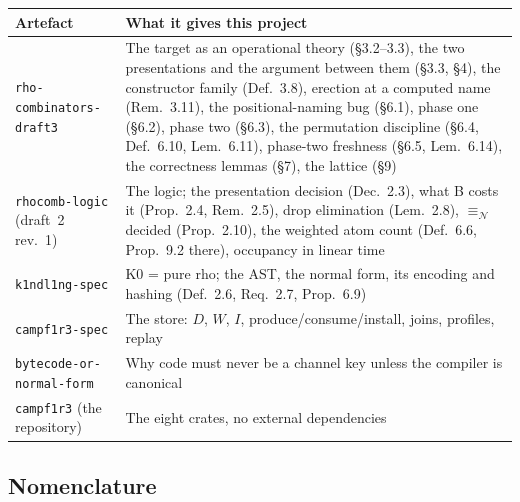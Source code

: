 \documentclass[11pt,a4paper]{article}
\newcommand{\code}[1]{\texttt{#1}}
\newcommand{\nequiv}{\equiv_{\mathcal{N}}}
\theoremstyle{definition}
\theoremstyle{plain}
\begin{document}
\begin{center}
\begin{tabularx}{\linewidth}{@{}l>{\raggedright\arraybackslash}X@{}}
\toprule
Artefact & What it gives this project\\
\midrule
\code{rho-combinators-draft3} & The target as an operational theory
(\S3.2--3.3), the two presentations and the argument between them (\S3.3,
\S4), the constructor family (Def.~3.8), erection at a computed name
(Rem.~3.11), the positional-naming bug (\S6.1), phase one (\S6.2), phase two
(\S6.3), the permutation discipline (\S6.4, Def.~6.10, Lem.~6.11), phase-two
freshness (\S6.5, Lem.~6.14), the correctness lemmas (\S7), the lattice
(\S9)\\
\code{rhocomb-logic} (draft~2 rev.~1) & The logic; the presentation decision
(Dec.~2.3), what B costs it (Prop.~2.4, Rem.~2.5), drop elimination
(Lem.~2.8), $\nequiv$ decided (Prop.~2.10), the weighted atom count
(Def.~6.6, Prop.~9.2 there), occupancy in linear time\\
\code{k1ndl1ng-spec} & K0 = pure rho; the AST, the normal form, its encoding
and hashing (Def.~2.6, Req.~2.7, Prop.~6.9)\\
\code{campf1r3-spec} & The store: $D$, $W$, $I$, produce/consume/install,
joins, profiles, replay\\
\code{bytecode-or-normal-form} & Why code must never be a channel key unless
the compiler is canonical\\
\code{campf1r3} (the repository) & The eight crates, no external
dependencies\\
\bottomrule
\end{tabularx}
\end{center}

\subsection{Nomenclature}\label{sec:nomen}
\end{document}
